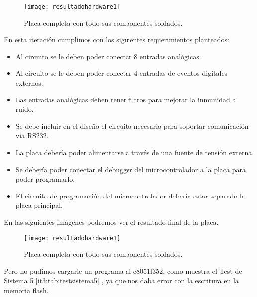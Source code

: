 \begin{figure}[H]
  \centering
  \texttt{[image: resultadohardware1]}
  \caption{Placa completa con todo sus componentes soldados.}\label{fig:resultadohardware1}
\end{figure}

En esta iteración cumplimos con los siguientes requerimientos planteados:
\begin{itemize}
  \item Al circuito se le deben poder conectar 8 entradas analógicas.
  \item Al circuito se le deben poder conectar 4 entradas de eventos digitales externos.
  \item Las entradas analógicas deben tener filtros para mejorar la inmunidad al ruido.
  \item Se debe incluir en el diseño el circuito necesario para soportar comunicación vía RS232.
  \item La placa debería poder alimentarse a través de una fuente de tensión externa.
  \item Se debería poder conectar el debugger del microcontrolador a la placa para poder programarlo.
  \item El circuito de programación del microcontrolador debería estar separado la placa principal.
\end{itemize}

En las siguientes imágenes podremos ver el resultado final de la placa.

\begin{figure}[H]
  \centering
  \texttt{[image: resultadohardware1]}
  \caption{Placa completa con todo sus componentes soldados.}\label{fig:resultadohardware1}
\end{figure}

Pero no pudimos cargarle un programa al c8051f352, como muestra el Test de Sistema 5 \ref{it3:tab:testsistema5} , ya que nos daba error con la escritura en la memoria flash.

